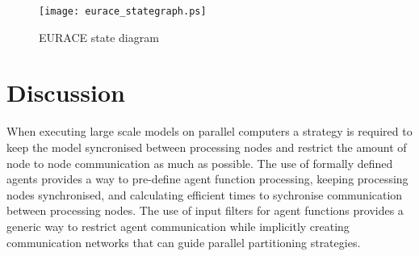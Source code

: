 \documentclass{aamas2009}
\begin{document}




% 
% 


\begin{figure}[hbp]
\centering
\texttt{[image: eurace\_stategraph.ps]}
\caption{EURACE state diagram}
\label{fig:eurace}
\end{figure}







% 
% 
% 
% 

\section{Discussion}

When executing large scale models on parallel computers a strategy is required
to keep the model syncronised between processing nodes and restrict the amount
of node to node communication as much as possible.
The use of formally defined agents provides a way to pre-define agent
function processing, keeping processing nodes synchronised, and calculating
efficient times to sychronise communication between processing nodes.
The use of input filters for agent functions provides a generic way to restrict
agent communication while implicitly creating communication networks that can
guide parallel partitioning strategies.
\end{document}
